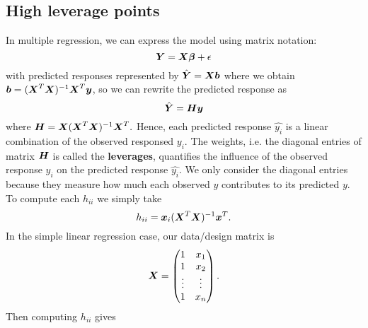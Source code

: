 \documentclass{report}
\newcommand{\bmgb}{\boldsymbol{\gb}}
\begin{document}
	\subsection{High leverage points}
	In multiple regression, we can express the model using matrix notation:
	$$\bmY=\bmX\bmgb+\eps$$
	with predicted responses represented by $\hat{\boldsymbol{Y}}=\boldsymbol{X}\boldsymbol{b}$ where we obtain $\boldsymbol{b}=(\boldsymbol{X}^T\boldsymbol{X})^{-1}\boldsymbol{X}^T\boldsymbol{y}$, so we can rewrite the predicted response as
	$$\hat{\boldsymbol{Y}}=\boldsymbol{H}\boldsymbol{y}$$
	where $\boldsymbol{H}=\boldsymbol{X}(\boldsymbol{X}^T\boldsymbol{X})^{-1}\boldsymbol{X}^T.$
	Hence, each predicted response $\hat{y_i}$ is a linear combination of the observed responsed $y_i$. The weights, i.e. the diagonal entries of matrix $\boldsymbol{H}$ is called the \textbf{leverages}, quantifies the influence of the observed response $y_i$ on the predicted response $\hat{y_i}$. We only consider the diagonal entries because they measure how much each observed $y$ contributes to its predicted $y$. To compute each $h_{ii}$ we simply take 
	$$h_{ii}=\boldsymbol{x}_i(\boldsymbol{X}^T\boldsymbol{X})^{-1}\boldsymbol{x}^T.$$
	In the simple linear regression case, our data/design matrix is
	$$\boldsymbol{X}=\begin{pmatrix}
		1 & x_1 \\ 1 & x_2 \\ \vdots & \vdots \\ 1 & x_n
	\end{pmatrix}.$$
	Then computing $h_{ii}$ gives
\end{document}

